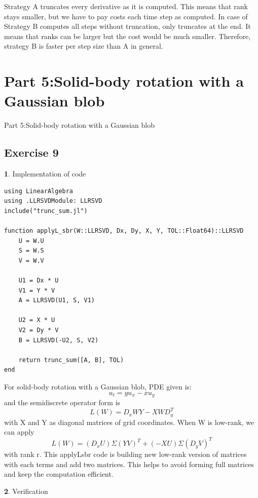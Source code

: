 \documentclass[11pt]{article}
\begin{document}
\vspace{0.6em}

Strategy A truncates every derivative as it is computed. This means that rank stays smaller, but we have to pay costs each time step as computed. In case of Strategy B computes all steps without truncation, only truncates at the end. It means that ranks can be larger but the cost would be much smaller. Therefore, strategy B is faster per step size than A in general.

\section*{Part 5:Solid-body rotation with a Gaussian blob}
{Part 5:Solid-body rotation with a Gaussian blob}

\subsection*{Exercise 9}
\textbf{1}. Implementation of code

\begin{lstlisting}
using LinearAlgebra
using .LLRSVDModule: LLRSVD
include("trunc_sum.jl")

function applyL_sbr(W::LLRSVD, Dx, Dy, X, Y, TOL::Float64)::LLRSVD
    U = W.U
    S = W.S
    V = W.V

    U1 = Dx * U
    V1 = Y * V
    A = LLRSVD(U1, S, V1)

    U2 = X * U
    V2 = Dy * V
    B = LLRSVD(-U2, S, V2)

    return trunc_sum([A, B], TOL)  
end

\end{lstlisting}

For solid-body rotation with a Gaussian blob, PDE given is:
\[
u_t = yu_x - xu_y
\]
and the semidiscrete operator form is 
\[
L(W) = D_xWY -XWD_y^T
\]
with X and Y as diagonal matrices of grid coordinates.
When W is low-rank, we can apply 
\[
L(W) = (D_xU)\Sigma(YV)^T +(-XU)\Sigma(D_yV)^T
\]
with rank r. This applyL\-sbr code is building new low-rank version of matrices with each terms and add two matrices. This helps to avoid forming full matrices and keep the computation efficient.

\vspace{1.5em}

\textbf{2}. Verification
\end{document}
